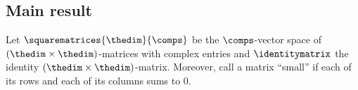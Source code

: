 \documentclass[pdftex]{sigma}
\numberwithin{equation}{section}
\begin{document}
\subsection{Main result}
\label{section:introduction-main-results}
{
  \newcommand{\themat}{v}
  \newcommand{\indi}{i}
  \newcommand{\indj}{j}
  \newcommand{\thecoc}{\eta}
  \newcommand{\thecocx}[1]{\eta(#1)}
  \newcommand{\thebetti}{\beta_1(\widehat{G})}
  \newcommand{\thesum}{\lambda}
  \newcommand{\neutralblocks}{3}
  \newcommand{\neutralpartitions}{4}
  \newcommand{\smallblocks}{1}
  \newcommand{\largeblocks}{2}

  Let  $\squarematrices{\thedim}{\comps}$ be the $\comps$-vector space of $(\thedim\times\thedim)$-matrices with complex entries and $\identitymatrix$ the identity $(\thedim\times\thedim)$-matrix. Moreover, call a matrix  ``small'' if each of its rows and each of its columns sums to $0$.

}
\end{document}
